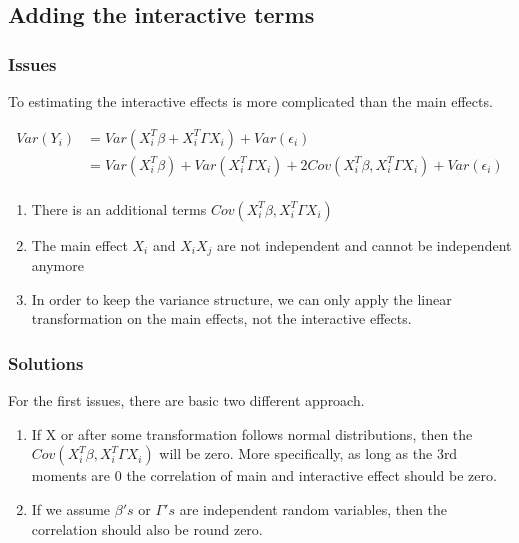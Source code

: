 \documentclass[]{article}
\providecommand{\tightlist}{%
  \setlength{\itemsep}{0pt}\setlength{\parskip}{0pt}}
\begin{document}
\subsection{Adding the interactive
terms}\label{adding-the-interactive-terms}

\subsubsection{Issues}\label{issues}

To estimating the interactive effects is more complicated than the main
effects.

\begin{align*}
Var(Y_i) &= Var(X_i^T\beta + X_i^T\Gamma X_i) + Var(\epsilon_i) \\
         &= Var(X_i^T\beta) + Var(X_i^T\Gamma X_i) + 2Cov(X_i^T\beta, X_i^T\Gamma X_i) + Var(\epsilon_i) \\
\end{align*}

\begin{enumerate}
\def\labelenumi{\arabic{enumi}.}
\tightlist
\item
  There is an additional terms \(Cov(X_i^T\beta, X_i^T\Gamma X_i)\)
\item
  The main effect \(X_i\) and \(X_i X_j\) are not independent and cannot
  be independent anymore
\item
  In order to keep the variance structure, we can only apply the linear
  transformation on the main effects, not the interactive effects.
\end{enumerate}

\subsubsection{Solutions}\label{solutions}

For the first issues, there are basic two different approach.

\begin{enumerate}
\def\labelenumi{\arabic{enumi}.}
\item
  If X or after some transformation follows normal distributions, then
  the \(Cov(X_i^T\beta, X_i^T\Gamma X_i)\) will be zero. More
  specifically, as long as the 3rd moments are 0 the correlation of main
  and interactive effect should be zero.
\item
  If we assume \(\beta's\) or \(\Gamma's\) are independent random
  variables, then the correlation should also be round zero.
\end{enumerate}
\end{document}
